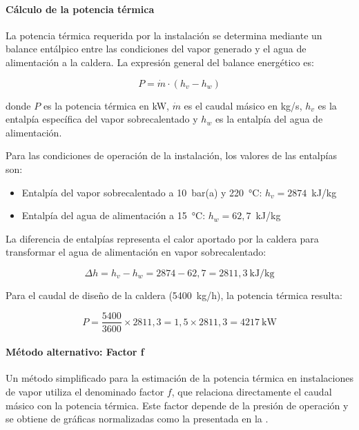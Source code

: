 \documentclass[12pt]{article}
\begin{document}
\paragraph{Cálculo de la potencia térmica}

La potencia térmica requerida por la instalación se determina mediante un balance entálpico entre las condiciones del vapor generado y el agua de alimentación a la caldera. La expresión general del balance energético es:

\begin{equation}
	P = \dot{m} \cdot (h_v - h_w)
	\label{eq:potencia-termica-balance}
\end{equation}

\noindent donde $P$ es la potencia térmica en kW, $\dot{m}$ es el caudal másico en kg/s, $h_v$ es la entalpía específica del vapor sobrecalentado y $h_w$ es la entalpía del agua de alimentación.

Para las condiciones de operación de la instalación, los valores de las entalpías son:

\begin{itemize}[leftmargin=2em]
	\item Entalpía del vapor sobrecalentado a 10~bar(a) y 220~°C: $h_v = 2874$~kJ/kg
	\item Entalpía del agua de alimentación a 15~°C: $h_w = 62{,}7$~kJ/kg
\end{itemize}

La diferencia de entalpías representa el calor aportado por la caldera para transformar el agua de alimentación en vapor sobrecalentado:

\begin{equation}
	\Delta h = h_v - h_w = 2874 - 62{,}7 = 2811{,}3 \ \text{kJ/kg}
	\label{eq:diferencia-entalpias}
\end{equation}

Para el caudal de diseño de la caldera (5400~kg/h), la potencia térmica resulta:

\begin{equation}
	P = \frac{5400}{3600} \times 2811{,}3 = 1{,}5 \times 2811{,}3 = 4217 \ \text{kW}
	\label{eq:potencia-caldera}
\end{equation}

\paragraph{Método alternativo: Factor f}

Un método simplificado para la estimación de la potencia térmica en instalaciones de vapor utiliza el denominado factor $f$, que relaciona directamente el caudal másico con la potencia térmica. Este factor depende de la presión de operación y se obtiene de gráficas normalizadas como la presentada en la .
\end{document}

